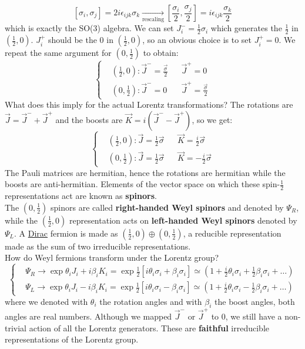 \documentclass[../main.tex]{subfiles}
\begin{document}
\[
[\sigma_i,\sigma_j]=2i\epsilon_{ijk}\sigma_k\xrightarrow[\text{rescaling}]{}\left[\frac{\sigma_i}{2},\frac{\sigma_j}{2}\right]=i\epsilon_{ijk}\frac{\sigma_k}{2}
\]
which is exactly the SO(3) algebra. We can set $J_i^-=\frac{1}{2}\sigma_i$ which generates the $\frac{1}{2}$ in $\left(\frac{1}{2},0\right)$. $J_i^+$ should be the 0 in $\left(\frac{1}{2},0\right)$, so an obvious choice is to set $J_i^+=0$. We repeat the same argument for $\left(0,\frac{1}{2}\right)$ to obtain:
\[
\left\{
\begin{aligned}
&\left(\frac{1}{2},0\right): \vec{J}^-=\frac{\Vec{\sigma}}{2}&&\vec{J}^+=0\\
&\left(0,\frac{1}{2}\right): \vec{J}^-=0&&\vec{J}^+=\frac{\Vec{\sigma}}{2}
\end{aligned}
\right.
\]
What does this imply for the actual Lorentz transformations? The rotations are $\Vec{J}=\Vec{J}^-+\Vec{J}^+$ and the boosts are $\Vec{K}=i(\Vec{J}^--\Vec{J}^+)$, so we get:
\[
\left\{
\begin{aligned}
&\left(\frac{1}{2},0\right): \vec{J}=\frac{1}{2}\Vec{\sigma}&&\vec{K}=\frac{i}{2}\Vec{\sigma}\\
&\left(0,\frac{1}{2}\right): \vec{J}=\frac{1}{2}\Vec{\sigma}&&\vec{K}=-\frac{i}{2}\Vec{\sigma}
\end{aligned}
\right.
\]
The Pauli matrices are hermitian, hence the rotations are hermitian while the boosts are anti-hermitian. Elements of the vector space on which these spin-$\frac{1}{2}$ representations act are known as \textbf{spinors}.\\
The $\left(0,\frac{1}{2}\right)$ spinors are called \textbf{right-handed Weyl spinors} and denoted by $\Psi_R$, while the $\left(\frac{1}{2},0\right)$ representation acts on \textbf{left-handed Weyl spinors} denoted by $\Psi_L$. A \href{https://en.wikipedia.org/wiki/Paul_Dirac}{Dirac} fermion is made as $\left(\frac{1}{2},0\right)\oplus\left(0,\frac{1}{2}\right)$, a reducible representation made as the sum of two irreducible representations.\\
How do Weyl fermions transform under the Lorentz group?
\[
\left\{
\begin{aligned}
&\Psi_R\to\exp{\theta_iJ_i+i\beta_iK_i}=\exp{\frac{1}{2}[i\theta_i\sigma_i+\beta_i\sigma_i]}\simeq\left(1+\frac{i}{2}\theta_i\sigma_i+\frac{1}{2}\beta_i\sigma_i+\dots\right)\\
&\Psi_L\to\exp{\theta_iJ_i-i\beta_iK_i}=\exp{\frac{1}{2}[i\theta_i\sigma_i-\beta_i\sigma_i]}\simeq\left(1+\frac{i}{2}\theta_i\sigma_i-\frac{1}{2}\beta_i\sigma_i+\dots\right)
\end{aligned}
\right.
\]
where we denoted with $\theta_i$ the rotation angles and with $\beta_i$ the boost angles, both angles are real numbers. Although we mapped $\Vec{J}^-$ or $\Vec{J}^+$ to 0, we still have a non-trivial action of all the Lorentz generators. These are \textbf{faithful} irreducible representations of the Lorentz group.
\end{document}
